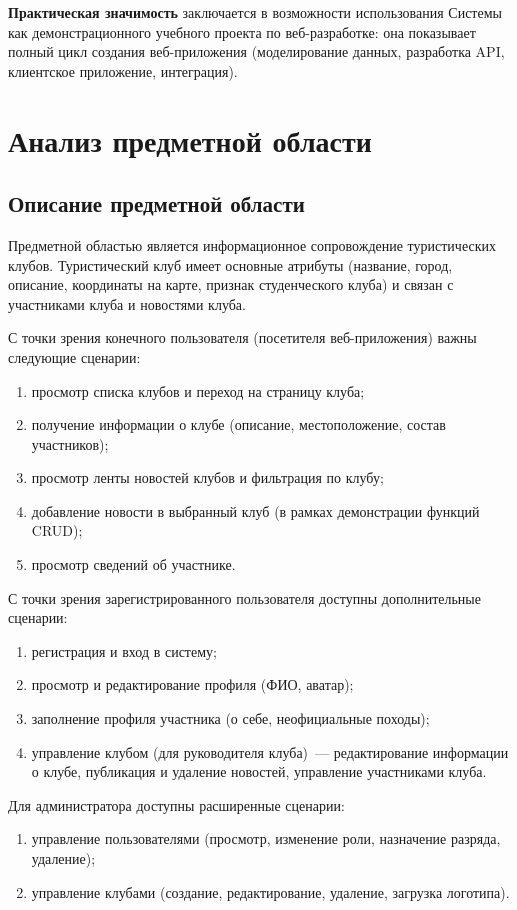\documentclass[utf8, russian]{eskdtext}
\let\stdsection\section
\renewcommand \section{\newpage\stdsection}
\begin{document}
\textbf{Практическая значимость} заключается в возможности использования Системы как демонстрационного учебного проекта по веб-разработке: она показывает полный цикл создания веб-приложения (моделирование данных, разработка API, клиентское приложение, интеграция).

\section{Анализ предметной области}
\subsection{Описание предметной области}
Предметной областью является информационное сопровождение туристических клубов. Туристический клуб имеет основные атрибуты (название, город, описание, координаты на карте, признак студенческого клуба) и связан с участниками клуба и новостями клуба.

С точки зрения конечного пользователя (посетителя веб-приложения) важны следующие сценарии:
\begin{enumerate}
  \item просмотр списка клубов и переход на страницу клуба;
  \item получение информации о клубе (описание, местоположение, состав участников);
  \item просмотр ленты новостей клубов и фильтрация по клубу;
  \item добавление новости в выбранный клуб (в рамках демонстрации функций CRUD);
  \item просмотр сведений об участнике.
\end{enumerate}

С точки зрения зарегистрированного пользователя доступны дополнительные сценарии:
\begin{enumerate}
  \item регистрация и вход в систему;
  \item просмотр и редактирование профиля (ФИО, аватар);
  \item заполнение профиля участника (о себе, неофициальные походы);
  \item управление клубом (для руководителя клуба)~--- редактирование информации о клубе, публикация и удаление новостей, управление участниками клуба.
\end{enumerate}

Для администратора доступны расширенные сценарии:
\begin{enumerate}
  \item управление пользователями (просмотр, изменение роли, назначение разряда, удаление);
  \item управление клубами (создание, редактирование, удаление, загрузка логотипа).
\end{enumerate}
\end{document}
